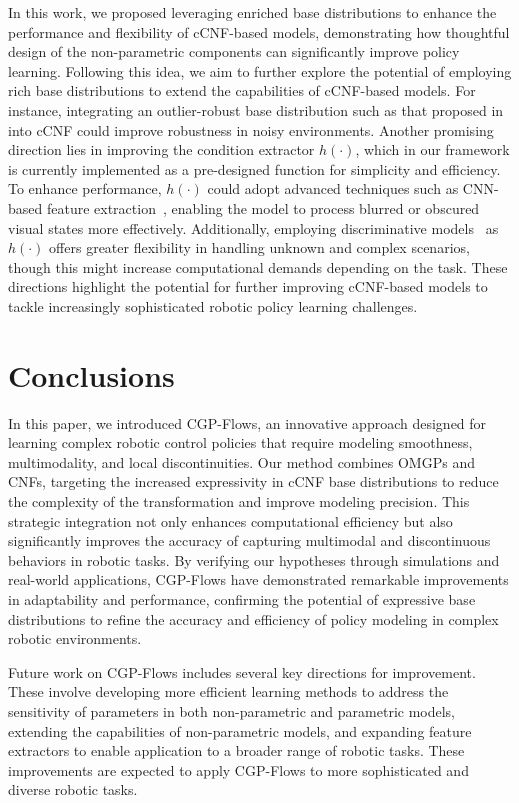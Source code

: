 \documentclass[sn-mathphys-num]{sn-jnl}
\begin{document}
In this work, we proposed leveraging enriched base distributions to enhance the performance and flexibility of cCNF-based models, demonstrating how thoughtful design of the non-parametric components can significantly improve policy learning. 
Following this idea, we aim to further explore the potential of employing rich base distributions to extend the capabilities of cCNF-based models.
For instance, integrating an outlier-robust base distribution such as that proposed in~\cite{jylanki11a} into cCNF could improve robustness in noisy environments.
Another promising direction lies in improving the condition extractor $h(\cdot)$, which in our framework is currently implemented as a pre-designed function for simplicity and efficiency.
To enhance performance, $h(\cdot)$ could adopt advanced techniques such as CNN-based feature extraction~\cite{li2020learning, zhang2021bioinspired}, enabling the model to process blurred or obscured visual states more effectively.
Additionally, employing discriminative models~\cite{jin2019multi, CHEN2020150} as $h(\cdot)$ offers greater flexibility in handling unknown and complex scenarios, though this might increase computational demands depending on the task.
These directions highlight the potential for further improving cCNF-based models to tackle increasingly sophisticated robotic policy learning challenges.



\section{Conclusions}
In this paper, we introduced CGP-Flows, an innovative approach designed for learning complex robotic control policies that require modeling smoothness, multimodality, and local discontinuities. Our method combines OMGPs and CNFs, targeting the increased expressivity in cCNF base distributions to reduce the complexity of the transformation and improve modeling precision. This strategic integration not only enhances computational efficiency but also significantly improves the accuracy of capturing multimodal and discontinuous behaviors in robotic tasks. By verifying our hypotheses through simulations and real-world applications, CGP-Flows have demonstrated remarkable improvements in adaptability and performance, confirming the potential of expressive base distributions to refine the accuracy and efficiency of policy modeling in complex robotic environments.

Future work on CGP-Flows includes several key directions for improvement.
These involve developing more efficient learning methods to address the sensitivity of parameters in both non-parametric and parametric models, extending the capabilities of non-parametric models, and expanding feature extractors to enable application to a broader range of robotic tasks.
These improvements are expected to apply CGP-Flows to more sophisticated and diverse robotic tasks.
\end{document}

